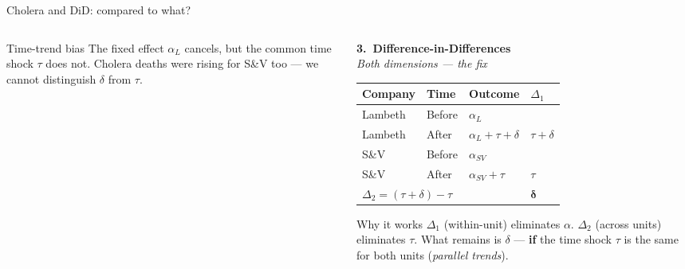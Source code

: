 \documentclass[aspectratio=169, 10pt]{beamer}
\begin{document}
\begin{frame}[shrink=8]{Cholera and DiD: compared to what?}
\begin{columns}[T]
\begin{column}{0.30\textwidth}
      \medskip
      \begin{alertblock}{\scriptsize Time-trend bias}
        \scriptsize The fixed effect $\alpha_L$ cancels, but the common time shock $\tau$ does not. Cholera deaths were rising for S\&V too — we cannot distinguish $\delta$ from $\tau$.
      \end{alertblock}
    \end{column}

    \begin{column}{0.36\textwidth}
      \textbf{\small 3.\ Difference-in-Differences}\\[-2pt]
      \textit{\scriptsize Both dimensions — the fix}
      \smallskip
      \begin{center}\scriptsize
      \begin{tabular}{llll}
        \toprule
        Company & Time   & Outcome               & $\Delta_1$ \\
        \midrule
        Lambeth & Before & $\alpha_L$            & \\
        Lambeth & After  & $\alpha_L+\tau+\delta$& $\tau+\delta$ \\
        \addlinespace
        S\&V    & Before & $\alpha_{SV}$         & \\
        S\&V    & After  & $\alpha_{SV}+\tau$    & $\tau$ \\
        \midrule
        \multicolumn{3}{l}{$\Delta_2 = (\tau+\delta) - \tau$} & $\boldsymbol{\delta}$ \\
        \bottomrule
      \end{tabular}
      \end{center}
      \smallskip
      \begin{block}{\scriptsize Why it works}
        \scriptsize $\Delta_1$ (within-unit) eliminates $\alpha$. $\Delta_2$ (across units) eliminates $\tau$. What remains is $\delta$ — \textbf{if} the time shock $\tau$ is the same for both units (\emph{parallel trends}).
      \end{block}
    \end{column}

  \end{columns}

\end{frame}
\end{document}
